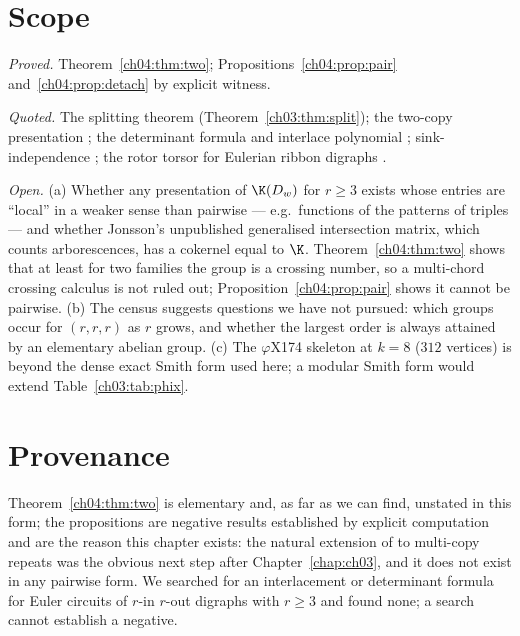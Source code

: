 \section{Scope}\label{ch04:sec:scope}

\emph{Proved.} Theorem~\ref{ch04:thm:two}; Propositions~\ref{ch04:prop:pair}
and~\ref{ch04:prop:detach} by explicit witness.

\emph{Quoted.} The splitting theorem (Theorem~\ref{ch03:thm:split}); the two-copy presentation \cite{MMN};
the determinant formula \cite{MacrisPule,Jonsson} and interlace polynomial \cite{ABS};
sink-independence \cite{HLMPPW}; the rotor torsor for Eulerian ribbon digraphs
\cite{Toth}.

\emph{Open.} (a) Whether any presentation of $\K(D_w)$ for $r\ge3$ exists whose entries
are ``local'' in a weaker sense than pairwise --- e.g.\ functions of the patterns of
triples --- and whether Jonsson's unpublished generalised intersection matrix, which
counts arborescences, has a cokernel equal to $\K$. Theorem~\ref{ch04:thm:two} shows that at
least for two families the group is a crossing number, so a multi-chord crossing calculus
is not ruled out; Proposition~\ref{ch04:prop:pair} shows it cannot be pairwise. (b) The
census suggests questions we have not pursued: which groups occur for $(r,r,r)$ as $r$
grows, and whether the largest order is always attained by an elementary abelian group.
(c) The $\varphi$X174 skeleton at $k=8$ ($312$ vertices) is beyond the dense exact Smith
form used here; a modular Smith form would extend Table~\ref{ch03:tab:phix}.

\section*{Provenance}

Theorem~\ref{ch04:thm:two} is elementary and, as far as we can find,
unstated in this form; the propositions are negative results established by explicit
computation and are the reason this chapter exists: the natural extension of \cite{MMN} to
multi-copy repeats was the obvious next step after Chapter~\ref{chap:ch03}, and it does not exist in
any pairwise form. We searched for an interlacement or determinant formula for Euler
circuits of $r$-in $r$-out digraphs with $r\ge3$ and found none; a search cannot
establish a negative.
